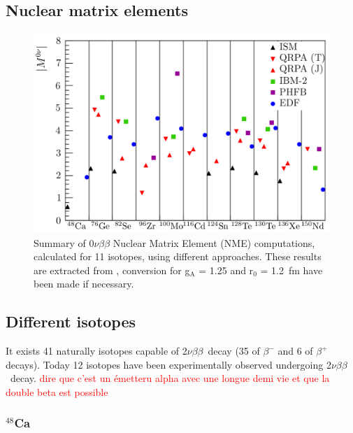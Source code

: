 \documentclass[main.tex]{subfiles}
\begin{document}
\FloatBarrier


\subsection{Nuclear matrix elements}\label{sec:NME}


\NI 



\begin{figure}[h!]
\begin{center}
\includegraphics[scale=0.30]{pictures/Chap2/NMEdetailes.png}
\caption{Summary of 0$\nu\beta\beta$ Nuclear Matrix Element (NME) computations, calculated for 11 isotopes, using different approaches. These results are extracted from \cite{TheoryOfNeutrinolessDBD}, conversion for g$_{\text{A}}$ = 1.25 and r$_{\text{0}}$  = 1.2~fm have been made if necessary.}
\label{NME}
\end{center}
\end{figure}


\FloatBarrier


\subsection{Different isotopes}


\NI It exists 41 naturally isotopes capable of 2$\nu\beta\beta$~decay (35 of $\beta^{-}$ and 6 of $\beta^{+}$ decays). Today 12 isotopes have been experimentally observed undergoing 2$\nu\beta\beta$~decay. \textcolor{red}{dire que c'est un émetteru alpha avec une longue demi vie et que la double beta est possible}


\subsubsection{$^{\text{48}}$Ca}
\end{document}
